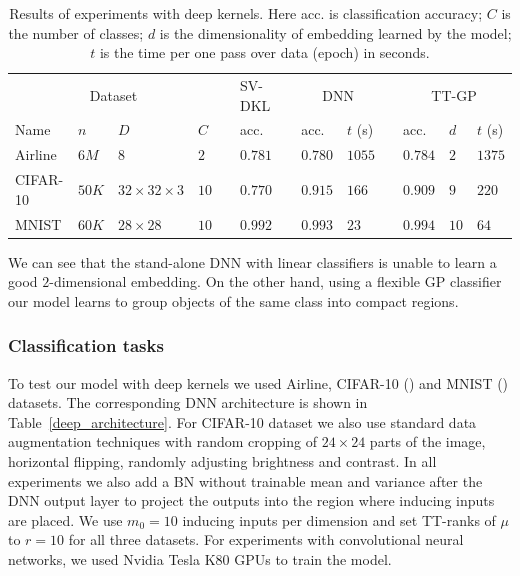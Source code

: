   \begin{table}[t]
    \vspace{-.5cm}
    \caption{Results of experiments with deep kernels. Here acc. is classification
            accuracy; $C$ is the number of classes; $d$ is the dimensionality
            of embedding learned by the model; $t$ is the time per one pass over
            data (epoch) in seconds.}
    \label{deep_results}
    \centering
    \begin{tabular}{llll ll llll lll}
      \toprule
      \multicolumn{4}{c}{Dataset}  && SV-DKL &&
      \multicolumn{2}{c}{DNN} &&
      \multicolumn{3}{c}{TT-GP}\\

      \cmidrule{1-4}
      \cmidrule{6-6}
      \cmidrule{8-9}
      \cmidrule{11-13}

      Name & $n$ & $D$ & $C$ &&
      acc. && acc. & $t$ (s) &&
      acc. & $d$ & $t$ (s)
      \\
      \midrule



      Airline & $6M$ & $8$ & $2$ &&
      $0.781$ && $0.780$ & $1055$ &&
      $0.784$ & $2$ & $1375$\\

      CIFAR-10 & $50K$ & $32{\times}32{\times}3$ & $10$ &&
      $0.770$ && $0.915$ & $166$ &&
      $0.909$ & $9$ & $220$\\

      MNIST & $60K$ & $28{\times}28$ & $10$ &&
      $0.992$ && $0.993$ & $23$ &&
      $0.994$ & $10$ & $64$\\
      \bottomrule
    \end{tabular}
    \vspace{-.5cm}
  \end{table}

  We can see that the stand-alone DNN with linear classifiers is unable
  to learn a good $2$-dimensional embedding.
  On the other hand, using a flexible GP classifier our
  model learns to group objects of the same class into compact regions.

  \subsubsection{Classification tasks}
  To test our model with deep kernels we used Airline,
  CIFAR-10 (\citet{krizhevsky2009}) and
  MNIST (\citet{lecun1998}) datasets. The corresponding DNN architecture is shown in Table~\ref{deep_architecture}. For CIFAR-10 dataset we also use standard data augmentation techniques with random cropping of $24 \times 24$
  parts of the image, horizontal flipping, randomly adjusting brightness and contrast. In all experiments we also add a BN without trainable mean and
  variance after the DNN output layer to project the outputs into the region
  where inducing inputs are placed. We use $m_0 = 10$ inducing inputs
  per dimension and set TT-ranks of $\mu$ to $r = 10$ for all three datasets. For experiments with convolutional neural networks, we
  used Nvidia Tesla K80 GPUs to train the model.

